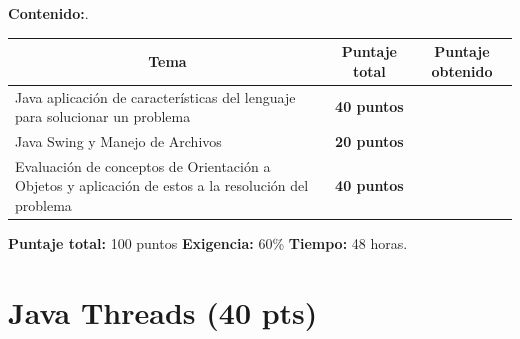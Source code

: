 \documentclass{exam}
\begin{document}
\vspace{5mm}
\noindent
\textbf{Contenido:}.

\vspace{2mm}
\noindent
\begin{table}[H]
{\normalsize
\begin{tabular}{|p{9.5cm}|p{3.3cm}|p{3.3cm}|}
\hline
    \multicolumn{1}{|c}{\textbf{Tema}} &
    \multicolumn{1}{|c}{\textbf{Puntaje total}} &
    \multicolumn{1}{|c|}{\textbf{Puntaje obtenido}} \\
\hline
    Java aplicaci\'on de caracter\'isticas del lenguaje para solucionar un problema  &
    \multicolumn{1}{|c|}{\textbf{40 puntos}} & \\
\hline
    Java Swing y Manejo de Archivos &
    \multicolumn{1}{|c|}{\textbf{20 puntos}} & \\
\hline
    Evaluaci\'on de conceptos de Orientaci\'on a Objetos y aplicaci\'on de estos a la resoluci\'on del problema&
    \multicolumn{1}{|c|}{\textbf{40 puntos}} & \\
\hline
\end{tabular}}
\end{table}

\vspace{-2mm}
\noindent
\textbf{Puntaje total:} 100 puntos \textbf{Exigencia:} 60\% \textbf{Tiempo:} 48 horas.

\newpage
\noindent
\section{\textbf{Java Threads (40 pts)}}
\noindent
\end{document}
